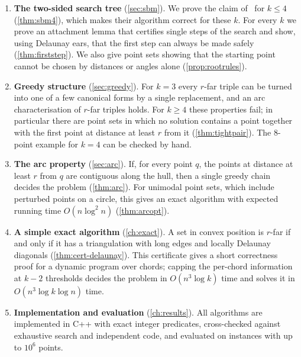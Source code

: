 \begin{enumerate}[leftmargin=*,itemsep=2pt]
\item \textbf{The two-sided search tree} (\cref{sec:sbm}). We prove the claim
of~\citet{sbm} for $k\le4$ (\cref{thm:sbm4}), which makes their algorithm
correct for these $k$. For every $k$ we prove an attachment lemma that
certifies single steps of the search and show, using Delaunay ears, that the
first step can always be made safely (\cref{thm:firststep}). We also give point
sets showing that the starting point cannot be chosen by distances or angles
alone (\cref{prop:rootrules}).

\item \textbf{Greedy structure} (\cref{sec:greedy}). For $k=3$ every $r$-far
triple can be turned into one of a few canonical forms by a single
replacement, and an arc characterisation of $r$-far triples holds. For
$k\ge4$ these properties fail; in particular there are point sets in which no
solution contains a point together with the first point at distance at least
$r$ from it (\cref{thm:tightpair}). The $8$-point example for $k=4$ can be
checked by hand.

\item \textbf{The arc property} (\cref{sec:arc}). If, for every point $q$, the
points at distance at least $r$ from $q$ are contiguous along the hull, then a
single greedy chain decides the problem (\cref{thm:arc}). For unimodal point
sets, which include perturbed points on a circle, this gives an exact
algorithm with expected running time $O(n\log^2n)$ (\cref{thm:arcopt}).

\item \textbf{A simple exact algorithm} (\cref{ch:exact}). A set in convex
position is $r$-far if and only if it has a triangulation with long edges and
locally Delaunay diagonals (\cref{thm:cert-delaunay}). This certificate gives a
short correctness proof for a dynamic program over chords; capping the
per-chord information at $k-2$ thresholds decides the problem in
$O(n^3\log k)$ time and solves it in $O(n^3\log k\log n)$ time.

\item \textbf{Implementation and evaluation} (\cref{ch:results}). All
algorithms are implemented in C++ with exact integer predicates, cross-checked
against exhaustive search and independent code, and evaluated on instances
with up to $10^6$ points.
\end{enumerate}
